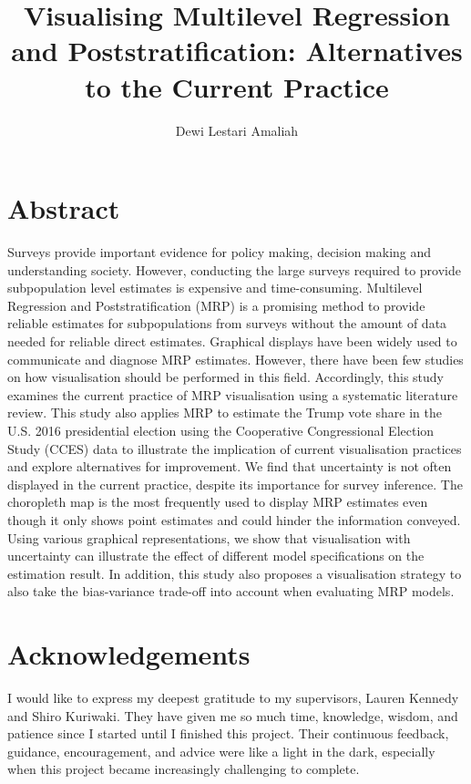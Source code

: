 \documentclass{monashthesis}
\author{Dewi Lestari Amaliah}
\title{Visualising Multilevel Regression and Poststratification: Alternatives to the Current Practice}
\begin{document}

\titlepage

{\sf\tighttoc\doublespacing}

\clearpage{}\setcounter{page}{0}

\hypertarget{abstract}{%
\chapter*{Abstract}\label{abstract}}

Surveys provide important evidence for policy making, decision making and understanding society. However, conducting the large surveys required to provide subpopulation level estimates is expensive and time-consuming. Multilevel Regression and Poststratification (MRP) is a promising method to provide reliable estimates for subpopulations from surveys without the amount of data needed for reliable direct estimates. Graphical displays have been widely used to communicate and diagnose MRP estimates. However, there have been few studies on how visualisation should be performed in this field. Accordingly, this study examines the current practice of MRP visualisation using a systematic literature review. This study also applies MRP to estimate the Trump vote share in the U.S. 2016 presidential election using the Cooperative Congressional Election Study (CCES) data to illustrate the implication of current visualisation practices and explore alternatives for improvement. We find that uncertainty is not often displayed in the current practice, despite its importance for survey inference. The choropleth map is the most frequently used to display MRP estimates even though it only shows point estimates and could hinder the information conveyed. Using various graphical representations, we show that visualisation with uncertainty can illustrate the effect of different model specifications on the estimation result. In addition, this study also proposes a visualisation strategy to also take the bias-variance trade-off into account when evaluating MRP models.\\
\newpage

\hypertarget{acknowledgements}{%
\chapter*{Acknowledgements}\label{acknowledgements}}

I would like to express my deepest gratitude to my supervisors, Lauren Kennedy and Shiro Kuriwaki. They have given me so much time, knowledge, wisdom, and patience since I started until I finished this project. Their continuous feedback, guidance, encouragement, and advice were like a light in the dark, especially when this project became increasingly challenging to complete.
\end{document}
